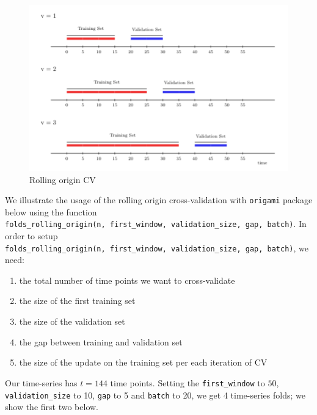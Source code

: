 \documentclass[12pt, krantz2,]{book}
\providecommand{\tightlist}{%
  \setlength{\itemsep}{0pt}\setlength{\parskip}{0pt}}
\theoremstyle{definition}
\theoremstyle{definition}
\theoremstyle{definition}
\newcommand{\1}{\mathbbm{1}}
\begin{document}
\begin{figure}

{\centering \includegraphics[width=0.8\linewidth]{img/image/rolling_origin} 

}

\caption{Rolling origin CV}\label{fig:unnamed-chunk-1}
\end{figure}

We illustrate the usage of the rolling origin cross-validation with \texttt{origami}
package below using the function \texttt{folds\_rolling\_origin(n,\ first\_window,\ validation\_size,\ gap,\ batch)}. In order to setup \texttt{folds\_rolling\_origin(n,\ first\_window,\ validation\_size,\ gap,\ batch)}, we need:

\begin{enumerate}
\def\labelenumi{\arabic{enumi}.}
\tightlist
\item
  the total number of time points we want to cross-validate
\item
  the size of the first training set
\item
  the size of the validation set
\item
  the gap between training and validation set
\item
  the size of the update on the training set per each iteration of CV
\end{enumerate}

Our time-series has \(t=144\) time points. Setting the \texttt{first\_window} to \(50\),
\texttt{validation\_size} to 10, \texttt{gap} to 5 and \texttt{batch} to 20, we get 4 time-series
folds; we show the first two below.
\end{document}
